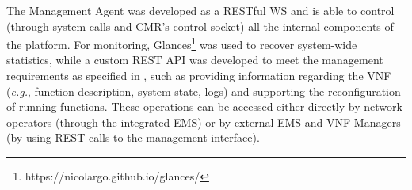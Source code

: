 



The Management Agent was developed as a RESTful WS and is able to control (through system calls and CMR's control socket) all the internal components of the platform. For monitoring, Glances\footnote{https://nicolargo.github.io/glances/} was used to recover system-wide statistics, while a custom REST API was developed to meet the management requirements as specified in \cite{Bondan-2014}, such as providing information regarding the VNF (\textit{e.g.}, function description, system state, logs) and supporting the reconfiguration of running functions. These operations can be accessed either directly by network operators (through the integrated EMS) or by external EMS and VNF Managers (by using REST calls to the management interface).

